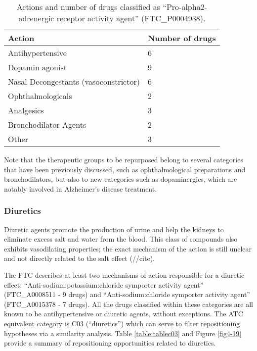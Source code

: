 \begin{table}[htbp]
\small
\begin{tabular}{|p{5cm}|p{5cm}|}
\hline
\textbf{Action} & \textbf{Number of drugs} \\ \hline
Antihypertensive  & 6 \\ \hline
Dopamin agonist & 9 \\ \hline
Nasal Decongestants (vasoconstrictor) & 6 \\ \hline
Ophthalmologicals & 2 \\ \hline
Analgesics & 3 \\ \hline
Bronchodilator Agents & 2 \\ \hline
Other & 3 \\ \hline
\end{tabular}
\caption{Actions and number of drugs classified as “Pro-alpha2-adrenergic receptor activity agent” (FTC\_P0004938).}
\label{table:tablealpha}
\end{table}

Note that the therapeutic groups to be repurposed belong to several categories that have been previously discussed, such as ophthalmological preparations and bronchodilators, but also to new categories such as dopaminergics, which are notably involved in Alzheimer's disease treatment.

\subsubsection{Diuretics}
Diuretic agents promote the production of urine and help the kidneys to eliminate excess salt and water from the blood. This class of compounds also exhibits vasodilating properties; the exact mechanism of the action is still unclear and not directly related to the salt effect (//cite).

The FTC describes at least two mechanisms of action responsible for a diuretic effect: “Anti-sodium:potassium:chloride symporter activity agent” (FTC\_A0008511 - 9 drugs) and “Anti-sodium:chloride symporter activity agent” (FTC\_A0015378 - 7 drugs). All the drugs classified within these categories are all known to be antihypertensive or diuretic agents, without exceptions. The ATC equivalent category is C03 (“diuretics”) which can serve to filter repositioning hypotheses via a similarity analysis. Table \ref{table:tablec03} and Figure \ref{fig4-19} provide a summary of repositioning opportunities related to diuretics.

